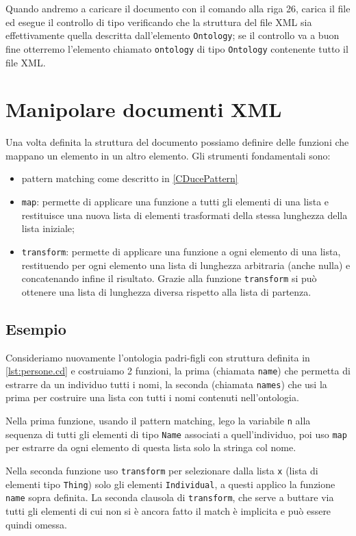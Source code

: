 Quando andremo a caricare il documento con il comando alla riga 26, \cduce carica il file ed esegue il controllo di tipo verificando che la struttura del file XML sia effettivamente quella descritta dall'elemento \verb|Ontology|; se il controllo va a buon fine otterremo l'elemento chiamato \verb|ontology| di tipo \verb|Ontology| contenente tutto il file XML.
\section{Manipolare documenti XML}
Una volta definita la struttura del documento possiamo definire delle funzioni che mappano un elemento in un altro elemento. Gli strumenti fondamentali sono:
\begin{itemize}
	\item pattern matching come descritto in \ref{CDucePattern}
	\item \verb|map|\label{map}: permette di applicare una funzione a tutti gli elementi di una lista e restituisce una nuova lista di elementi trasformati della stessa lunghezza della lista iniziale;
	\item \verb|transform|: permette di applicare una funzione a ogni elemento di una lista, restituendo per ogni elemento una lista di lunghezza arbitraria (anche nulla) e concatenando infine il risultato. Grazie alla funzione \verb|transform| si può ottenere una lista di lunghezza diversa rispetto alla lista di partenza.
\end{itemize}
\subsection{Esempio}
Consideriamo nuovamente l'ontologia padri-figli con struttura definita in \ref{lst:persone.cd} e costruiamo 2 funzioni, la prima (chiamata \verb|name|) che permetta di estrarre da un individuo tutti i nomi, la seconda (chiamata \verb|names|) che usi la prima per costruire una lista con tutti i nomi contenuti nell'ontologia.

Nella prima funzione, usando il pattern matching, lego la variabile \verb|n| alla sequenza di tutti gli elementi di tipo \verb|Name| associati a quell'individuo, poi uso \verb|map| per estrarre da ogni elemento di questa lista solo la stringa col nome.

Nella seconda funzione uso \verb|transform| per selezionare dalla lista \verb|x| (lista di elementi tipo \verb|Thing|) solo gli elementi \verb|Individual|, a questi applico la funzione \verb|name| sopra definita. La seconda clausola di \verb|transform|, che serve a buttare via tutti gli elementi di cui non si è ancora fatto il match è implicita e può essere quindi omessa.

